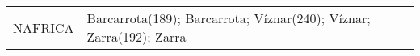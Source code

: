 \documentclass[journal abbreviation, manuscript]{copernicus}
\begin{document}
\begin{table}
\begin{tabularx}{\textwidth}{lX}
  NAFRICA  & Barcarrota(189); Barcarrota; Víznar(240); Víznar; Zarra(192); Zarra                                                                                                                                                                                                                                                                                                                                                                                                                                                                                                                                                                                                                                                                                                                                                                                                                                                                                                                                                                                                                                                                                                                                                                                                                                                                                                                                                                                                                                                                                                                                                                                                                                                                                                                                                                                                                                                                                                                                                                                                                                                                                                                                                                                                                                                                                                                                                                                                                                                                                                                                                                                                                                                                                                                                                                                                                                                                                                                                                                                                                                                                                                                                                                                                                                                                                                                                         
\end{tabularx}
\end{table}
\end{document}
